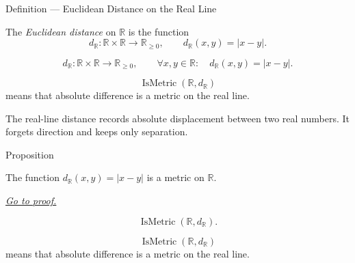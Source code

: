 \begin{definitionbox}{Definition --- Euclidean Distance on the Real Line}
\begin{definition}
\label{def:real-line-euclidean-distance}
The \emph{Euclidean distance} on \(\mathbb{R}\) is the function
\[
  d_{\mathbb{R}}:\mathbb{R}\times\mathbb{R}\to\mathbb{R}_{\geq 0},
  \qquad
  d_{\mathbb{R}}(x,y)=|x-y|.
\]
\end{definition}
\end{definitionbox}

\begin{remark*}
\[
d_{\mathbb{R}}:\mathbb{R}\times\mathbb{R}\to\mathbb{R}_{\geq 0},
\qquad
\forall x,y\in\mathbb{R}{:}\quad d_{\mathbb{R}}(x,y)=|x-y|.
\]
\end{remark*}

\begin{remark*}
\[
\operatorname{IsMetric}(\mathbb{R},d_{\mathbb{R}})
\]
means that absolute difference is a metric on the real line.
\end{remark*}

\begin{remark*}[Interpretation]
The real-line distance records absolute displacement between two real numbers.
It forgets direction and keeps only separation.
\end{remark*}


\DefinitionalRoot

\begin{propositionbox}{Proposition}
\begin{proposition}
\label{prop:real-line-euclidean-distance-metric}
The function \(d_{\mathbb{R}}(x,y)=|x-y|\) is a metric on \(\mathbb{R}\).

\smallskip
\noindent
\hyperref[prf:real-line-euclidean-distance-metric]{\textit{Go to proof.}}
\end{proposition}
\end{propositionbox}

\begin{remark*}
\[
  \operatorname{IsMetric}(\mathbb{R},d_{\mathbb{R}}).
\]
\end{remark*}

\begin{remark*}
\[
\operatorname{IsMetric}(\mathbb{R},d_{\mathbb{R}})
\]
means that absolute difference is a metric on the real line.
\end{remark*}

